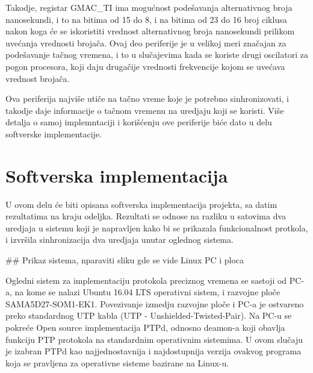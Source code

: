 \documentclass[a4paper,12pt, master]{etf}
\begin{document}
        Takodje, registar GMAC\_TI ima mogu\'{c}nost pode\v{s}avanja
        alternativnog broja nanosekundi, i to na bitima od 15 do 8, i na bitima
        od 23 do 16 broj ciklusa nakon koga \'{c}e se iskoristiti vrednost
        alternativnog broja nanosekundi prilikom uve\'{c}anja vrednosti
        broja\v{c}a. Ovaj deo periferije je u velikoj meri zna\v{c}ajan za
        pode\v{s}avanje ta\v{c}nog vremena, i to u slu\v{c}ajevima kada se
        koriste drugi oscilatori za pogon procesora, koji daju druga\v{c}ije
        vrednosti frekvencije kojom se uve\'{c}ava vrednost broja\v{c}a.

        Ova periferija najvi\v{s}e uti\v{c}e na ta\v{c}no vreme koje je potrebno
        sinhronizovati, i takodje daje informacije o ta\v{c}nom vremenu na uredjaju
        koji se koristi. Vi\v{s}e detalja o samoj implemntaciji i kori\v{s}\'{c}enju
        ove periferije bi\'{c}e dato u delu softverske implementacije.

	\newpage

	\chapter{Softverska implementacija}

        U ovom delu \'{c}e biti opisana softverska implementacija projekta, sa
        datim rezultatima na kraju odeljka. Rezultati se odnose na razliku u
        satovima dva uredjaja u sistemu koji je napravljen kako bi se prikazala
        funkcionalnost protkola, i izvr\v{s}ila sinhronizacija dva uredjaja
        unutar oglednog sistema.

        \#\# Prikaz sistema, nparaviti sliku gde se vide Linux PC i ploca

        Ogledni sistem za implementaciju protokola preciznog vremena se sastoji
        od PC-a, na kome se nalazi Ubuntu 16.04 LTS operativni sistem, i
        razvojne plo\v{c}e SAMA5D27-SOM1-EK1. Povezivanje izmedju razvojne
        plo\v{c}e i PC-a je ostvareno preko standardnog UTP kabla (UTP -
        Unshielded-Twisted-Pair). Na PC-u se pokre\'{c}e Open source
        implementacija PTPd, odnosno deamon-a koji obavlja funkciju PTP
        protokola na standardnim operativnim sistemima. U ovom slu\v{c}aju je
        izabran PTPd kao najjednostavnija i najdostupnija verzija ovakvog
        programa koja se pravljena za operativne sisteme bazirane na Linux-u.
\end{document}
